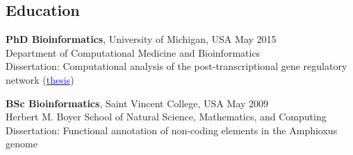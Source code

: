 \documentclass[margin,line]{res}
\begin{document}
\begin{resume}



\section{\sc Education}
{\bf PhD Bioinformatics}, University of Michigan, USA \hfill {May 2015}\\
Department of Computational Medicine and Bioinformatics\\ 
Dissertation: Computational analysis of the post-transcriptional gene regulatory network (\href{https://deepblue.lib.umich.edu/bitstream/handle/2027.42/111339/mafree_1.pdf?sequence=1&isAllowed=y}{\textcolor{blue}{thesis}})

{\bf BSc Bioinformatics}, Saint Vincent College, USA \hfill {May 2009}\\
Herbert M. Boyer School of Natural Science, Mathematics, and Computing\\
Dissertation: Functional annotation of non-coding elements in the Amphioxus genome


\end{resume}
\end{document}
